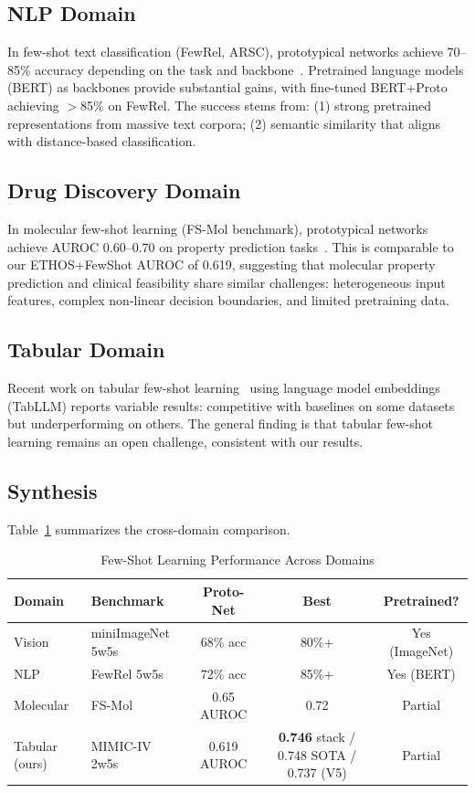 \subsection{NLP Domain}

In few-shot text classification (FewRel, ARSC), prototypical networks achieve 70--85\% accuracy depending on the task and backbone~\cite{han2018fewrel}. Pretrained language models (BERT) as backbones provide substantial gains, with fine-tuned BERT+Proto achieving $>$85\% on FewRel. The success stems from: (1) strong pretrained representations from massive text corpora; (2) semantic similarity that aligns with distance-based classification.

\subsection{Drug Discovery Domain}

In molecular few-shot learning (FS-Mol benchmark), prototypical networks achieve AUROC 0.60--0.70 on property prediction tasks~\cite{stanley2021fs}. This is comparable to our ETHOS+FewShot AUROC of 0.619, suggesting that molecular property prediction and clinical feasibility share similar challenges: heterogeneous input features, complex non-linear decision boundaries, and limited pretraining data.

\subsection{Tabular Domain}

Recent work on tabular few-shot learning~\cite{hegselmann2023tabllm} using language model embeddings (TabLLM) reports variable results: competitive with baselines on some datasets but underperforming on others. The general finding is that tabular few-shot learning remains an open challenge, consistent with our results.

\subsection{Synthesis}

Table~\ref{tab:cross_domain} summarizes the cross-domain comparison.

\begin{table}[htbp]
\centering
\caption{Few-Shot Learning Performance Across Domains}
\small
\begin{tabular}{llccc}
\toprule
\textbf{Domain} & \textbf{Benchmark} & \textbf{Proto-Net} & \textbf{Best} & \textbf{Pretrained?} \\
\midrule
Vision & miniImageNet 5w5s & 68\% acc & 80\%+ & Yes (ImageNet) \\
NLP & FewRel 5w5s & 72\% acc & 85\%+ & Yes (BERT) \\
Molecular & FS-Mol & 0.65 AUROC & 0.72 & Partial \\
Tabular (ours) & MIMIC-IV 2w5s & 0.619 AUROC & \textbf{0.746} stack / 0.748 SOTA / 0.737 (V5) & Partial \\
\bottomrule
\end{tabular}
\label{tab:cross_domain}
\end{table}

